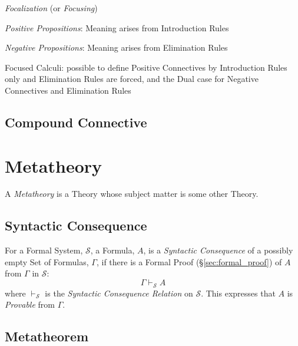 \emph{Focalization} (or \emph{Focusing})

\emph{Positive Propositions}: Meaning arises from Introduction Rules

\emph{Negative Propositions}: Meaning arises from Elimination Rules

Focused Calculi: possible to define Positive Connectives by
Introduction Rules only and Elimination Rules are forced, and the Dual
case for Negative Connectives and Elimination Rules



\subsection{Compound Connective}\label{sec:compound_connective}



\section{Metatheory} \label{sec:metatheory}

A \emph{Metatheory} is a Theory whose subject matter is some other
Theory.



\subsection{Syntactic Consequence}\label{sec:syntactic_consequence}

For a Formal System, $\mathcal{S}$, a Formula, $A$, is a \emph{Syntactic
  Consequence} of a possibly empty Set of Formulas, $\Gamma$, if there
is a Formal Proof (\S\ref{sec:formal_proof}) of $A$ from $\Gamma$ in
$\mathcal{S}$:
\[
  \Gamma \vdash_{\mathcal{S}} A
\]
where $\vdash_{\mathcal{S}}$ is the \emph{Syntactic Consequence
  Relation} on $\mathcal{S}$. This expresses that $A$ is
\emph{Provable} from $\Gamma$.



\subsection{Metatheorem}\label{sec:metatheorem}

